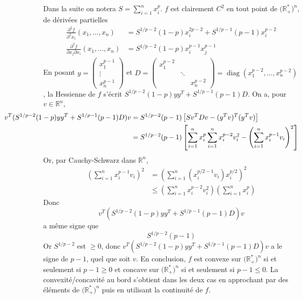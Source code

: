 \documentclass{report}
\DeclareMathOperator{\diag}{diag}
\begin{document}
\subsection{} \noindent{}\\ 
\\ 
\\
\noindent Dans la suite on notera $S=\sum_{i=1}^n x_i^p$.\newline
$f$ est clairement $C^2$ en tout point de $\mathbb (\mathbb R_+^*)^n$, de dérivées partielles 
$$\begin{aligned}
\frac{\partial^2 f}{\partial^2x_i}(x_1,\ldots,x_n) &= S^{1/p-2}(1-p)x_i^{2p-2} +S^{1/p-1}(p-1)x_i^{p-2} \\
\frac{\partial^2 f}{\partial x_j \partial x_i}(x_1,\ldots,x_n) &= S^{1/p-2}(1-p)x_i^{p-1} x_j^{p-1}
\end{aligned}$$
En posant $y=\begin{pmatrix}
x_1^{p-1} \\
\vdots \\
x_n^{p-1} 
\end{pmatrix}$ et $D=\begin{pmatrix}
x_1^{p-2}  \\
& \ddots \\
&& x_n^{p-2} 
\end{pmatrix}=\diag(x_1^{p-2},\ldots,x_n^{p-2})$,\newline
\newline
la Hessienne de $f$ s'écrit $S^{1/p-2}(1-p)yy^T +S^{1/p-1}(p-1)D$. On a, pour $v\in \mathbb R^n$,
$$\begin{aligned}
\hspace{-2cm}
v^T(S^{1/p-2}(1-p)yy^T +S^{1/p-1}(p-1)D)v &= S^{1/p-2}(p-1) \left[ S v^TDv - (y^Tv)^T(y^Tv)\right] \\
&= S^{1/p-2}(p-1) \left[ \sum_{i=1}^n x_i^p \sum_{i=1}^n x_i^{p-2}v_i^2 - \left(\sum_{i=1}^n x_i^{p-1}v_i\right)^2 \right]
\end{aligned}$$
Or, par Cauchy-Schwarz dans $\mathbb R^n$, $$\begin{aligned}\left(\sum_{i=1}^n x_i^{p-1}v_i\right)^2 &= \left(\sum_{i=1}^n (x_i^{p/2-1}v_i)x_i^{p/2}\right)^2 \\
&\leq \left(\sum_{i=1}^n x_i^{p-2}v_i^2\right) \left( \sum_{i=1}^n x_i^p\right)
 \end{aligned}$$
 Donc $$v^T(S^{1/p-2}(1-p)yy^T +S^{1/p-1}(p-1)D)v$$ a même signe que $$S^{1/p-2}(p-1)$$
 Or $S^{1/p-2}$ est $\geq 0$, donc $v^T(S^{1/p-2}(1-p)yy^T +S^{1/p-1}(p-1)D)v$ a le signe de $p-1$, quel que soit $v$.
\newline
\newline
En conclusion, $f$ est convexe sur $\mathbb (\mathbb R_+^*)^n$ si et seulement si $p-1\geq 0$ et concave sur $\mathbb (\mathbb R_+^*)^n$ si et seulement si $p-1\leq 0$.\newline
La convexité/concavité au bord s'obtient dans les deux cas en approchant par des éléments de $\mathbb (\mathbb R_+^*)^n$ puis en utilisant la continuité de $f$.
\end{document}
